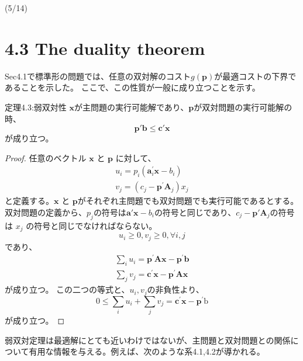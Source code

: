 \documentclass{jsarticle}
\begin{document}
 (5/14)
\section*{4.3 The duality theorem}
Sec4.1で標準形の問題では、任意の双対解のコスト$g(\bm{p})$が最適コストの下界であることを示した。
ここで、この性質が一般に成り立つことを示す。

\begin{itembox}[l]{定理4.3:弱双対性}
  $\bm{x}$が主問題の実行可能解であり、$\bm{p}$が双対問題の実行可能解の時、
  \begin{equation}
    \bm{p}'\bm{b} \leq \bm{c}'\bm{x}
  \end{equation}
  が成り立つ。
\end{itembox}

\begin{proof}
任意のベクトル $\bm{x}$ と $\bm{p}$ に対して、
\begin{equation}
  \begin{array}{l}
  u_{i}=p_{i}\left(\mathbf{a}_{i}^{\prime} \mathbf{x}-b_{i}\right) \\
  v_{j}=\left(c_{j}-\mathbf{p}^{\prime} \mathbf{A}_{j}\right) x_{j}
  \end{array}
\end{equation}
と定義する。$\bm{x}$ と $\bm{p}$がそれぞれ主問題でも双対問題でも実行可能であるとする。
双対問題の定義から、$p_j$の符号は$\bm{a}'\bm{x}-b_i$の符号と同じであり、$c_j- \bm{p}'\bm{A}_j$の符号は $x_j$ の符号と同じでなければならない。
\begin{equation}
  u_i\geq 0,v_j\geq 0,\forall i,j
\end{equation}
であり、
\begin{equation}
  \begin{array}{l}
  \sum_{i} u_{i}=\mathbf{p}^{\prime} \mathbf{A} \mathbf{x}-\mathbf{p}^{\prime} \mathbf{b} \\
  \sum_{j} v_{j}=\mathbf{c}^{\prime} \mathbf{x}-\mathbf{p}^{\prime} \mathbf{A} \mathbf{x}
  \end{array}
\end{equation}
が成り立つ。
この二つの等式と、$u_i, v_j$の非負性より、
\begin{equation}
  0 \leq \sum_{i} u_{i}+\sum_{j} v_{j}=\mathbf{c}^{\prime} \mathbf{x}-\mathbf{p}^{\prime} \mathrm{b}
\end{equation}
が成り立つ。
\end{proof}

弱双対定理は最適解にとても近いわけではないが、主問題と双対問題との関係について有用な情報を与える。例えば、次のような系4.1,4.2が導かれる。
\end{document}
